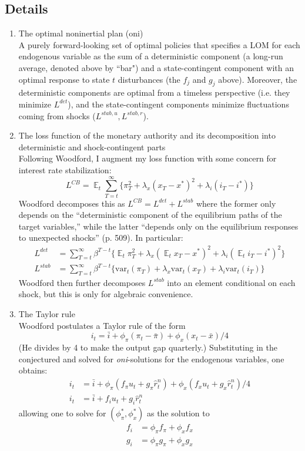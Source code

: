 \documentclass[11pt]{article}
\renewcommand{\[}{\begin{equation}}
\renewcommand{\]}{\end{equation}}
\DeclareMathOperator{\E}{\mathbb{E}}
\begin{document}
\subsection{Details}
\begin{enumerate}
\item The optimal noninertial plan (oni)\\
A purely forward-looking set of optimal policies that specifies a LOM for each endogenous variable as the sum of a deterministic component (a long-run average, denoted above by ``bar") and a state-contingent component with an optimal response to state $t$ disturbances (the $f_j$ and $g_j$ above). Moreover, the deterministic components are optimal from a timeless perspective (i.e. they minimize $L^{det}$), and the state-contingent components minimize fluctuations coming from shocks ($L^{stab,u}, L^{stab,r}$). 
\item The loss function of the monetary authority and its decomposition into deterministic and shock-contingent parts \\
Following Woodford, I augment my loss function with some concern for interest rate stabilization:
\begin{equation}
L^{CB} =\E_t \sum_{T=t}^{\infty}\{\pi_T^2 +\lambda_x(x_T - x^*)^2 +\lambda_i(i_T - i^*)\}
\end{equation}
Woodford decomposes this as $L^{CB}= L^{det} + L^{stab}$ where the former only depends on the ``deterministic component of the equilibrium paths of the target variables,'' while the latter ``depends only on the equilibrium responses to unexpected shocks'' (p. 509). In particular:
\begin{align}
L^{det} & = \sum_{T=t}^{\infty}\beta^{T-t}\{\E_t{\pi_T^2} +\lambda_x(\E_tx_T -x^*)^2 + \lambda_i(\E_ti_T -i^*)^2 \}\\
L^{stab} & = \sum_{T=t}^{\infty}\beta^{T-t}\{\text{var}_t(\pi_T)+\lambda_x\text{var}_t(x_T) + \lambda_i\text{var}_t(i_T) \}
\end{align}
Woodford then further decomposes $L^{stab}$ into an element conditional on each shock, but this is only for algebraic convenience.
\item The Taylor rule \\
Woodford postulates a Taylor rule of the form
\begin{equation}
i_t = \bar{i} + \phi_{\pi}(\pi_t - \bar{\pi}) + \phi_x(x_t -\bar{x})/4 
\end{equation}
(He divides by 4 to make the output gap quarterly.) Substituting in the conjectured and solved for \emph{oni}-solutions for the endogenous variables, one obtains:
\begin{align}
i_t & = \bar{i} + \phi_{\pi}(f_{\pi}u_t + g_{\pi}\hat{r}_t^n) + \phi_x(f_{x}u_t + g_{x}\hat{r}_t^n)/4 \\
i_t & = \bar{i} + f_i u_t + g_i \hat{r}^n_t
\end{align}
allowing one to solve for $(\phi_{\pi}^*, \phi_x^*)$ as the solution to
\begin{align}
f_i & = \phi_{\pi}f_{\pi} + \phi_xf_{x} \\
g_i & = \phi_{\pi}g_{\pi} + \phi_xg_{x}
\end{align}
\end{enumerate}
\end{document}
